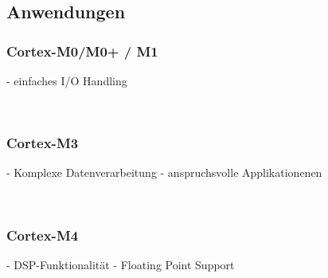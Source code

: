 \subsection{Anwendungen}
    \begin{minipage}{6cm}
       \subsubsection{Cortex-M0/M0+ / M1}  
        - einfaches I/O Handling 
    \end{minipage}
    \begin{minipage}{0.25cm}
    	\-\
    \end{minipage}
    \begin{minipage}{6cm}
        \subsubsection{Cortex-M3}   
        - Komplexe Datenverarbeitung\newline
        - anspruchsvolle Applikationenen
    \end{minipage}
    \begin{minipage}{0.25cm}
    	\-\
    \end{minipage}
    \begin{minipage}{6cm}
        \subsubsection{Cortex-M4}   
       -  DSP-Funktionalität\newline
       -  Floating Point Support
    \end{minipage}

